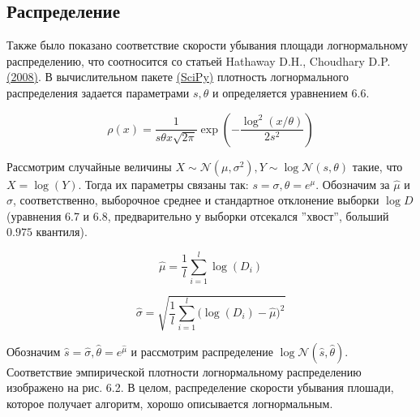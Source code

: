 \documentclass[a4paper, 12pt]{article}
\newcommand{\bibref}[3]{#2 \hyperlink{#1}{\color{blue}(#3)}}
\begin{document}
\subsection{Распределение}

Также было показано соответствие скорости убывания площади логнормальному распределению, что соотносится со статьей \bibref{hathaway}{Hathaway D.H., Choudhary D.P.}{2008}. В вычислительном пакете \bibref{scipy}{}{SciPy} плотность логнормального распределения задается параметрами $s, \theta$ и определяется уравнением 6.6.

\begin{equation}
    \rho(x) = \frac{1}{s\theta x \sqrt{2\pi}} \exp\left(-\frac{\log^2\left(x / \theta \right)}{2s^2}\right)
\end{equation}

Рассмотрим случайные величины $X \sim \mathcal{N}(\mu, \sigma^2), Y \sim \log \mathcal{N}(s, \theta)$ такие, что $X = \log(Y)$. Тогда их параметры связаны так: $s = \sigma, \theta = e^{\mu}$. Обозначим за $\widehat{\mu}$ и $\widehat{\sigma}$, соответственно, выборочное среднее и стандартное отклонение выборки $\log D$ (уравнения 6.7 и 6.8, предварительно у выборки отсекался ''хвост'', больший $0.975$ квантиля).

\begin{equation}
    \widehat{\mu} = \frac{1}{l}\sum_{i=1}^l \log(D_i)
\end{equation}

\begin{equation}
    \widehat{\sigma} = \sqrt{\frac{1}{l} \sum_{i=1}^l \big(\log(D_i) - \widehat{\mu}\big)^2}
\end{equation}

Обозначим $\widehat{s} = \widehat{\sigma}, \widehat{\theta} = e^{\widehat{\mu}}$ и рассмотрим распределение $\log \mathcal{N}(\widehat{s}, \widehat{\theta})$. Соответствие эмпирической плотности логнормальному распределению изображено на рис. 6.2. В целом, распределение скорости убывания плошади, которое получает алгоритм, хорошо описывается логнормальным.
\end{document}
